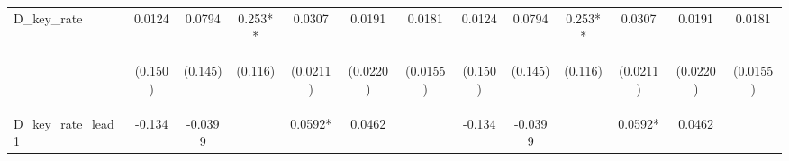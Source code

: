 \documentclass[]{article}
\begin{document}
\begin{center}
\begin{tabular}{lcccccccccccc}
D\_key\_rate & 0.0124 & 0.0794 & 0.253** & 0.0307 & 0.0191 & 0.0181 & 0.0124 & 0.0794 & 0.253** & 0.0307 & 0.0191 & 0.0181 \\
\vspace{4pt} & \begin{footnotesize}(0.150)\end{footnotesize} & \begin{footnotesize}(0.145)\end{footnotesize} & \begin{footnotesize}(0.116)\end{footnotesize} & \begin{footnotesize}(0.0211)\end{footnotesize} & \begin{footnotesize}(0.0220)\end{footnotesize} & \begin{footnotesize}(0.0155)\end{footnotesize} & \begin{footnotesize}(0.150)\end{footnotesize} & \begin{footnotesize}(0.145)\end{footnotesize} & \begin{footnotesize}(0.116)\end{footnotesize} & \begin{footnotesize}(0.0211)\end{footnotesize} & \begin{footnotesize}(0.0220)\end{footnotesize} & \begin{footnotesize}(0.0155)\end{footnotesize} \\
D\_key\_rate\_lead1 & -0.134 & -0.0399 &  & 0.0592* & 0.0462 &  & -0.134 & -0.0399 &  & 0.0592* & 0.0462 &  \\

\end{tabular}
\end{center}
\end{document}

